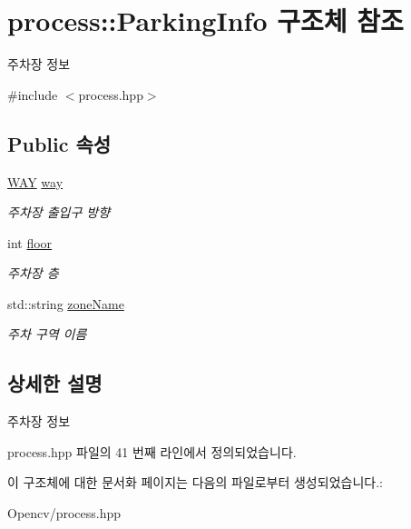\hypertarget{structprocess_1_1_parking_info}{}\section{process\+:\+:Parking\+Info 구조체 참조}
\label{structprocess_1_1_parking_info}


주차장 정보  




{\ttfamily \#include $<$process.\+hpp$>$}

\subsection*{Public 속성}
\begin{DoxyCompactItemize}
\item 
\mbox{\label{structprocess_1_1_parking_info_a21cc54db5d5a701d62b544d13224bafe}} 
\hyperlink{namespaceprocess_aa30669026e4cf69a2550aace23bef68e}{W\+AY} \hyperlink{structprocess_1_1_parking_info_a21cc54db5d5a701d62b544d13224bafe}{way}
\begin{DoxyCompactList}\small\item\em 주차장 출입구 방향 \end{DoxyCompactList}\item 
\mbox{\label{structprocess_1_1_parking_info_a0f83caa9ca3bf71e33a79db65ef4bff8}} 
int \hyperlink{structprocess_1_1_parking_info_a0f83caa9ca3bf71e33a79db65ef4bff8}{floor}
\begin{DoxyCompactList}\small\item\em 주차장 층 \end{DoxyCompactList}\item 
\mbox{\label{structprocess_1_1_parking_info_a0435386b258dfafdebcf6ce33648cc8d}} 
std\+::string \hyperlink{structprocess_1_1_parking_info_a0435386b258dfafdebcf6ce33648cc8d}{zone\+Name}
\begin{DoxyCompactList}\small\item\em 주차 구역 이름 \end{DoxyCompactList}\end{DoxyCompactItemize}


\subsection{상세한 설명}
주차장 정보 

process.\+hpp 파일의 41 번째 라인에서 정의되었습니다.



이 구조체에 대한 문서화 페이지는 다음의 파일로부터 생성되었습니다.\+:\begin{DoxyCompactItemize}
\item 
Opencv/process.\+hpp\end{DoxyCompactItemize}
